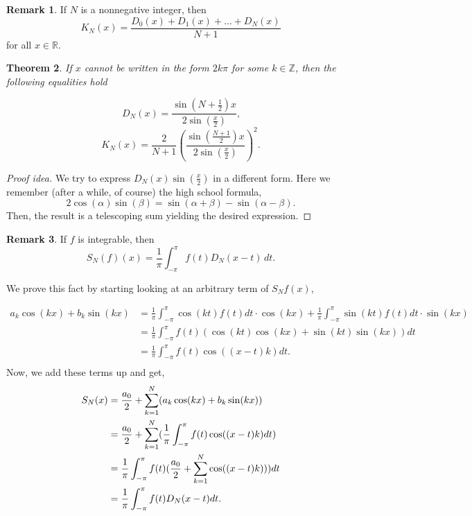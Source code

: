 \documentclass[12pt]{amsart}
\newtheorem{theorem}{Theorem}[section]
\theoremstyle{definition}
\newtheorem{remark}[theorem]{Remark}
\begin{document}
\begin{remark}\label{relation between dirichlet and fejer}
    If $N$ is a nonnegative integer, then
\[
K_N(x) = \frac{D_0(x) + D_1(x) + \dots + D_N(x)}{N+1}
\]
for all $x \in \mathbb{R}$.
\end{remark}


\begin{theorem}\label{non-series forms of kernels}
    If $x$ cannot be written in the form $2k\pi$ for some $k \in \mathbb{Z}$, then the following equalities hold

    \[
    D_N(x) = \frac{\sin\left(N + \frac{1}{2}\right)x}{2\sin(\frac{x}{2})} \text{,}
    \]
    \[
    K_N(x) = \frac{2}{N+1}\left(\frac{\sin\left(\frac{N + 1}{2}\right)x}{2\sin(\frac{x}{2})}\right)^2 \text{.}
    \]
\end{theorem}


\begin{proof}[Proof idea] We try to express  $D_N(x)\sin(\frac{x}{2})$ in a different form. Here we remember (after a while, of course) the high school formula,
\[
2\cos(\alpha)\sin(\beta) = \sin(\alpha + \beta) - \sin(\alpha - \beta) \text{.}
\]
    Then, the result is a telescoping sum yielding the desired expression.
\end{proof}



     \begin{remark}\label{dirichlet convolution for S_N}
         If \(f\) is integrable, then
    \[
    S_N(f)(x) = \frac{1}{\pi}\int_{-\pi}^{\pi}f(t)D_N(x-t)\,dt \text{.}
    \]
     \end{remark}


        We prove this fact by starting looking at an arbitrary term of $S_Nf(x)$,

        \begin{align*}
            a_k\cos(kx) + b_k\sin(kx) &= \frac{1}{\pi}\int_{-\pi}^{\pi}\cos(kt)f(t)dt \cdot \cos(kx) + \frac{1}{\pi}\int_{-\pi}^{\pi}\sin(kt)f(t)dt \cdot \sin(kx)\\
        &= \frac{1}{\pi}\int_{-\pi}^{\pi}f(t)(\cos(kt)\cos(kx) + \sin(kt)\sin(kx))dt\\
        &= \frac{1}{\pi}\int_{-\pi}^{\pi}f(t)\cos((x-t)k)dt \text{.}\\ 
        \end{align*}
        Now, we add these terms up and get,
        \begin{align*}
            S_N(x) &=\frac{a_0}{2} + \sum_{k=1}^{N} (a_k\cos(kx) + b_k\sin(kx))\\
            &= \frac{a_0}{2} + \sum_{k=1}^{N}(\frac{1}{\pi}\int_{-\pi}^{\pi}f(t)\cos((x-t)k)dt) \\
            &= \frac{1}{\pi}\int_{-\pi}^{\pi}f(t) (\frac{a_0}{2} + \sum_{k=1}^{N}\cos((x-t)k))) dt\\
            &= \frac{1}{\pi}\int_{-\pi}^{\pi}f(t)D_N(x-t)dt \text{.}\qedhere
        \end{align*}
\end{document}
